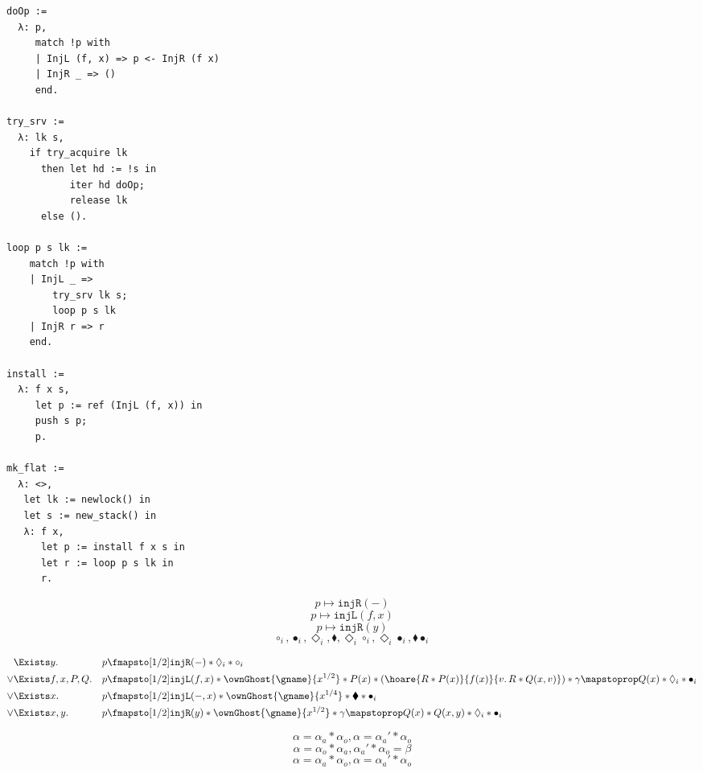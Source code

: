 \documentclass[10pt]{article}
\newcommand{\bdia}{\blacklozenge}
\newcommand{\dia}{\Diamond}
\newcommand{\injR}{\texttt{injR}}
\newcommand{\injL}{\texttt{injL}}
\begin{document}
\begin{verbatim}
doOp :=
  λ: p,
     match !p with
     | InjL (f, x) => p <- InjR (f x)
     | InjR _ => ()
     end.

try_srv :=
  λ: lk s,
    if try_acquire lk
      then let hd := !s in
           iter hd doOp;
           release lk
      else ().

loop p s lk :=
    match !p with
    | InjL _ =>
        try_srv lk s;
        loop p s lk
    | InjR r => r
    end.

install :=
  λ: f x s,
     let p := ref (InjL (f, x)) in
     push s p;
     p.

mk_flat :=
  λ: <>,
   let lk := newlock() in
   let s := new_stack() in
   λ: f x,
      let p := install f x s in
      let r := loop p s lk in
      r.
\end{verbatim}

\[p \mapsto \injR(-)\]
\[p \mapsto \texttt{injL}(f, x)\]
\[p \mapsto \injR(y)\]
\[\circ_i, \bullet_i, \dia_i, \bdia, \dia_i \circ_i, \dia_i \bullet_i, \bdia \bullet_i\]


\begin{align*}
     &\Exists y.          &&p \fmapsto[1/2] \injR(-) * \dia_i * \circ_i\\
\lor &\Exists f, x, P, Q. &&p \fmapsto[1/2] \injL(f, x) * \ownGhost{\gname}{x^{1/2}} *
                           P(x) * (\hoare{R * P(x)}{f(x)}{v.\,R * Q(x, v)}) * \gamma \mapstoprop Q(x) * \dia_i * \bullet_i\\
\lor &\Exists x.          &&p \fmapsto[1/2] \injL(-, x) * \ownGhost{\gname}{x^{1/4}} * \bdia * \bullet_i\\
\lor &\Exists x, y.       &&p \fmapsto[1/2] \injR(y) * \ownGhost{\gname}{x^{1/2}} * \gamma \mapstoprop Q(x) * Q(x, y) * \dia_i * \bullet_i
\end{align*}

\[\alpha = \alpha_a * \alpha_o, \alpha = \alpha_a' * \alpha_o\]
\[\alpha = \alpha_o * \alpha_a, \alpha_a' * \alpha_o = \beta\]
\[\alpha = \alpha_a * \alpha_o, \alpha = \alpha_a' * \alpha_o\]
\end{document}

